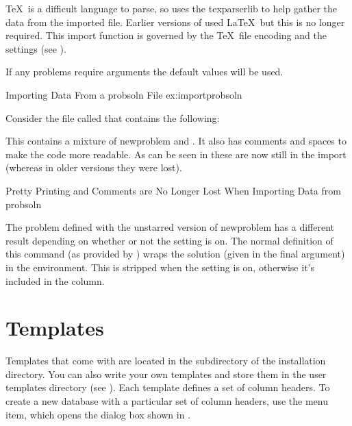    \TeX\ is a difficult language to parse, so  uses the
   \gls{texparserlib} to help gather the data from the imported 
   file. Earlier versions of  used \LaTeX\ but this is no longer 
   required. This import function is governed by the \TeX\ file encoding
   and the  settings 
   (see ).


   \begin{information}
   If any problems require arguments the default values 
   will be used.
   \end{information}

\begin{example}
 {Importing Data From a probsoln File}
 {ex:importprobsoln}

   Consider the file called  that contains the 
   following:



   This contains a mixture of \gls{newproblem} and
   . It also has comments and spaces to make
   the code more readable. As can be seen in 
   these are now still in the import (whereas in older versions they were lost).

 {%
 }
 {Pretty Printing and Comments are No Longer Lost When Importing Data from probsoln}

\end{example}

   The problem defined with the unstarred version of \gls{newproblem}
   has a different result depending on whether or not the 
    setting is on. The 
   normal definition of this command (as provided by )
   wraps the solution (given in the final argument) in the 
    environment. This is stripped when the setting is
   on, otherwise it's included in the  column.


\chapter{Templates}\label{sec:templates}

   Templates that come with  are located in the 
   subdirectory of the  installation directory. You can also write
   your own templates and store them in the user templates directory 
   (see ). Each template defines a set
   of column headers. To create a new database with a particular
   set of column headers, use the 
   menu item, which opens the dialog box shown in .

